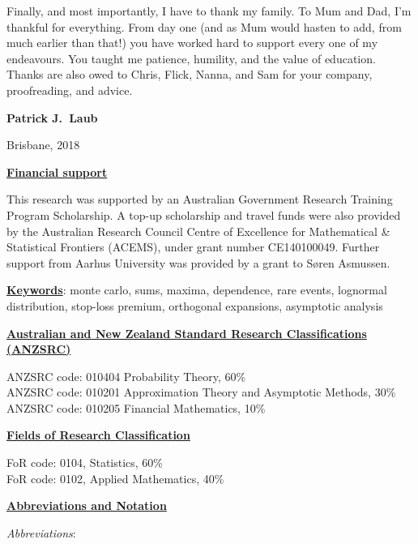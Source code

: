 Finally, and most importantly, I have to thank my family. To Mum and Dad, I'm thankful for everything. From day one (and as Mum would hasten to add, from much earlier than that!) you have worked hard to support every one of my endeavours. You taught me patience, humility, and the value of education. Thanks are also owed to Chris, Flick, Nanna, and Sam for your company, proofreading, and advice.

\vspace{-0.8em}
\hfill {\bf Patrick J.\ Laub}

\vspace{-0.8em}
\hfill Brisbane, 2018

\newpage
{\bf \underline{Financial support}}

This research was supported by an Australian Government Research Training Program Scholarship.
A top-up scholarship and travel funds were also provided by the Australian Research Council Centre of Excellence for
Mathematical \& Statistical Frontiers (ACEMS), under grant number CE140100049. Further support from Aarhus University was provided by a grant to S{\o}ren Asmussen.

{\bf \underline{Keywords}}: monte carlo, sums, maxima, dependence, rare events, lognormal distribution, stop-loss premium, orthogonal expansions, asymptotic analysis


{\bf \underline{Australian and New Zealand Standard Research Classifications
(ANZSRC)}}

ANZSRC code: 010404 Probability Theory, 60\% \\
ANZSRC code: 010201 Approximation Theory and Asymptotic Methods, 30\% \\
ANZSRC code: 010205 Financial Mathematics, 10\%


{\bf \underline{Fields of Research Classification}}

FoR code: 0104, Statistics, 60\% \\
FoR code: 0102, Applied Mathematics, 40\%

\tableofcontents

\newpage

{\bf \underline{Abbreviations and Notation}}



\emph{Abbreviations}:

